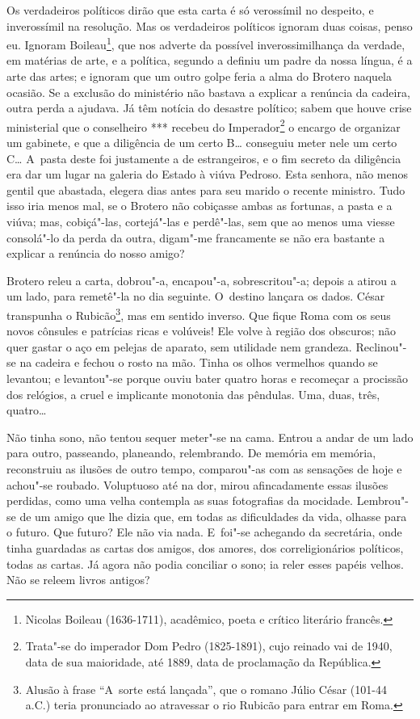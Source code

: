 Os verdadeiros políticos dirão que esta carta é só verossímil no
despeito, e inverossímil na resolução. Mas os verdadeiros políticos
ignoram duas coisas, penso eu. Ignoram Boileau\footnote{Nicolas Boileau
  (1636-1711), acadêmico, poeta e crítico literário francês.}, que nos
adverte da possível inverossimilhança da verdade, em matérias de arte, e
a política, segundo a definiu um padre da nossa língua, é a arte das
artes; e ignoram que um outro golpe feria a alma do Brotero naquela
ocasião. Se a exclusão do ministério não bastava a explicar a renúncia
da cadeira, outra perda a ajudava. Já têm notícia do desastre político;
sabem que houve crise ministerial que o conselheiro *** recebeu do
Imperador\footnote{Trata"-se do imperador Dom Pedro  (1825-1891), cujo
  reinado vai de 1940, data de sua maioridade, até 1889, data de
  proclamação da República.} o encargo de organizar um gabinete, e que a
diligência de um certo B\ldots{} conseguiu meter nele um certo C\ldots{} A~pasta
deste foi justamente a de estrangeiros, e o fim secreto da diligência
era dar um lugar na galeria do Estado à viúva Pedroso. Esta senhora, não
menos gentil que abastada, elegera dias antes para seu marido o recente
ministro. Tudo isso iria menos mal, se o Brotero não cobiçasse ambas as
fortunas, a pasta e a viúva; mas, cobiçá"-las, cortejá"-las e perdê"-las,
sem que ao menos uma viesse consolá"-lo da perda da outra, digam"-me
francamente se não era bastante a explicar a renúncia do nosso amigo?

Brotero releu a carta, dobrou"-a, encapou"-a, sobrescritou"-a; depois a
atirou a um lado, para remetê"-la no dia seguinte. O~destino lançara os
dados. César transpunha o Rubicão\footnote{Alusão à frase ``A~sorte está
  lançada'', que o romano Júlio César (101-44 a.C.) teria pronunciado ao
  atravessar o rio Rubicão para entrar em Roma.}, mas em sentido
inverso. Que fique Roma com os seus novos cônsules e patrícias ricas e
volúveis! Ele volve à região dos obscuros; não quer gastar o aço em
pelejas de aparato, sem utilidade nem grandeza. Reclinou"-se na cadeira e
fechou o rosto na mão. Tinha os olhos vermelhos quando se levantou; e
levantou"-se porque ouviu bater quatro horas e recomeçar a procissão dos
relógios, a cruel e implicante monotonia das pêndulas. Uma, duas, três,
quatro\ldots{}

Não tinha sono, não tentou sequer meter"-se na cama. Entrou a andar de um
lado para outro, passeando, planeando, relembrando. De memória em
memória, reconstruiu as ilusões de outro tempo, comparou"-as com as
sensações de hoje e achou"-se roubado. Voluptuoso até na dor, mirou
afincadamente essas ilusões perdidas, como uma velha contempla as suas
fotografias da mocidade. Lembrou"-se de um amigo que lhe dizia que, em
todas as dificuldades da vida, olhasse para o futuro. Que futuro? Ele
não via nada. E~foi"-se achegando da secretária, onde tinha guardadas as
cartas dos amigos, dos amores, dos correligionários políticos, todas as
cartas. Já agora não podia conciliar o sono; ia reler esses papéis
velhos. Não se releem livros antigos?

